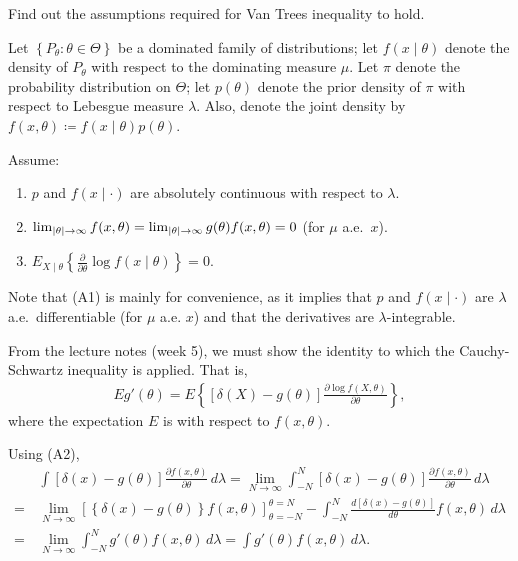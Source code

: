 \begin{question}
  Find out the assumptions required for Van Trees inequality to hold.
\end{question}

\begin{solution}
  Let \( \left\{ P_\theta: \theta \in \Theta \right\} \) be a dominated family of distributions; let \( f(x \mid \theta) \) denote the density of \( P_\theta \) with respect to the dominating measure \( \mu \). Let \( \pi \) denote the probability distribution on \( \Theta \); let \( p(\theta) \) denote the prior density of \( \pi \) with respect to Lebesgue measure \( \lambda \). Also, denote the joint density by \( f(x, \theta) \coloneqq f(x \mid \theta) p(\theta) \).

  Assume:

  \begin{enumerate}[label={(A\arabic*)}]
    \item \( p \) and \( f(x \mid \cdot ) \) are absolutely continuous with respect to \( \lambda \).
    \item \( \lim_{\left\lvert\theta\right\rvert \to \infty} f(x, \theta) = \lim_{\left\lvert\theta\right\rvert \to \infty} g(\theta) f(x, \theta) = 0 \) (for \( \mu \) a.e.~\( x \)).
    \item \( E_{X \mid \theta}\left\{ \frac{\partial }{\partial \theta} \log f(x \mid  \theta) \right\} = 0 \).
  \end{enumerate}

  Note that (A1) is mainly for convenience, as it implies that \( p \) and \( f(x \mid  \cdot ) \) are \( \lambda \) a.e.~differentiable (for \( \mu \) a.e. \( x \)) and that the derivatives are \( \lambda \)-integrable.

  From the lecture notes (week 5), we must show the identity to which the Cauchy-Schwartz inequality is applied. That is,
  \begin{align*}
    E g'(\theta) = E\left\{ [\delta(X) - g(\theta)] \frac{\partial \log f(X, \theta)}{\partial \theta}\right\},
  \end{align*}
  where the expectation \( E \) is with respect to \( f(x, \theta) \).

  Using (A2),
  \[
    \begin{aligned}
          & \int [\delta(x) - g(\theta)] \frac{\partial f(x, \theta)}{\partial \theta}\, d \lambda = \lim_{N \to \infty} \int_{-N}^{N} [\delta(x) - g(\theta)] \frac{\partial f(x, \theta)} {\partial \theta}\, d \lambda \\
      =\, & \lim_{N \to \infty} \left[ \left\{ \delta(x) - g(\theta) \right\} f(x, \theta) \right]_{\theta = -N}^{\theta = N} - \int_{-N}^{N} \frac{d [\delta(x) - g(\theta)]}{d \theta} f(x, \theta)\,d \lambda          \\
      =\, & \lim_{N \to \infty} \int_{-N}^N g'(\theta) f(x, \theta)\,d \lambda = \int g'(\theta) f(x, \theta)\, d\lambda.
    \end{aligned}
  \]


\end{solution}
